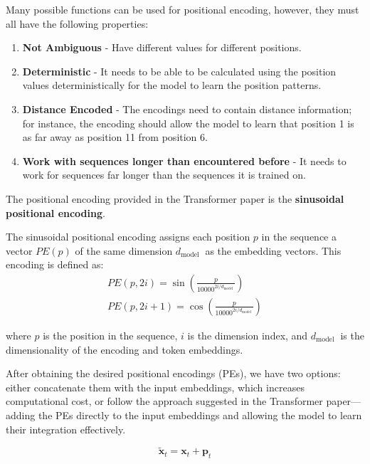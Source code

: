 \documentclass[11pt,twoside]{article}
\begin{document}
Many possible functions can be used for positional encoding, however, they must all have the following properties:

\begin{enumerate}
    \item \textbf{Not Ambiguous} - Have different values for different positions.
    
    \item \textbf{Deterministic} - It needs to be able to be calculated using the position values deterministically for the model to learn the position patterns.
    
    \item \textbf{Distance Encoded} - The encodings need to contain distance information; for instance, the encoding should allow the model to learn that position 1 is as far away as position 11 from position 6.
    
    \item \textbf{Work with sequences longer than encountered before} - It needs to work for sequences far longer than the sequences it is trained on.
\end{enumerate}

The positional encoding provided in the Transformer paper is the \textbf{sinusoidal positional encoding}.

The sinusoidal positional encoding assigns each position $p$ in the sequence a vector $P E(p)$ of the same dimension $d_{\text {model }}$ as the embedding vectors. This encoding is defined as:
$$
\begin{gathered}
P E(p, 2 i)=\sin \left(\frac{p}{10000^{2 i / d_{\text {model }}}}\right) \\
P E(p, 2 i+1)=\cos \left(\frac{p}{10000^{2 i / d_{\text {model }}}}\right)
\end{gathered}
$$

where $p$ is the position in the sequence, $i$ is the dimension index, and $d_{\text {model }}$ is the dimensionality of the encoding and token embeddings.

After obtaining the desired positional encodings (PEs), we have two options: either concatenate them with the input embeddings, which increases computational cost, or follow the approach suggested in the Transformer paper—adding the PEs directly to the input embeddings and allowing the model to learn their integration effectively.

$$
\tilde{\mathbf{x}}_t=\mathbf{x}_t+\mathbf{p}_t
$$
\end{document}
